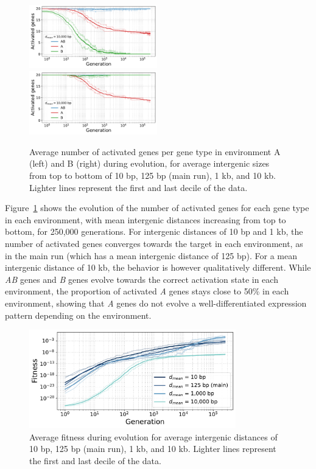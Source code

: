 \begin{figure}[H]
\includegraphics[width=0.495\textwidth]{param/mean-intergene/inter-10k/gene_activity_env_A.pdf}
\includegraphics[width=0.495\textwidth]{param/mean-intergene/inter-10k/gene_activity_env_B.pdf}
\caption[Evolution of the number of activated genes in each environment, with increasing mean intergenic distances]{Average number of activated genes per gene type in environment A (left) and B (right) during evolution, for average intergenic sizes from top to bottom of 10 bp, 125 bp (main run), 1 kb, and 10 kb.
Lighter lines represent the first and last decile of the data.}
\label{fig:param:mean-intergene-activ-by-env}
\end{figure}

Figure~\ref{fig:param:mean-intergene-activ-by-env} shows the evolution of the number of activated genes for each gene type in each environment, with mean intergenic distances increasing from top to bottom, for 250,000 generations.
For intergenic distances of 10 bp and 1 kb, the number of activated genes converges towards the target in each environment, as in the main run (which has a mean intergenic distance of 125 bp).
For a mean intergenic distance of 10 kb, the behavior is however qualitatively different.
While \emph{AB} genes and \emph{B} genes evolve towards the correct activation state in each environment, the proportion of activated \emph{A} genes stays close to 50\% in each environment, showing that \emph{A} genes do not evolve a well-differentiated expression pattern depending on the environment.

\begin{figure}[H]
\centering
\includegraphics[width=0.8\textwidth]{param/mean-intergene/fitness_all_with_main.pdf}
\caption[Average fitness during evolution, with increasing mean intergenic distances]{Average fitness during evolution for average intergenic distances of 10 bp, 125 bp (main run), 1 kb, and 10 kb.
Lighter lines represent the first and last decile of the data.}
\label{fig:param:mean-intergene-fitness}
\end{figure}

